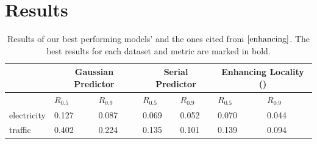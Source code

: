 \documentclass[en]{pracamgr}
\begin{document}


\section{Results}



\begin{table}[h]

\begin{center}
\begin{tabular}
	{ |p{2cm}|p{1.5cm}|p{1.5cm}||p{1.5cm}|p{1.5cm}||p{1.5cm}|p{1.5cm}|  }
	\hline
	& \multicolumn{2}{c||}{Gaussian Predictor} & \multicolumn{2}{|c||}{Serial Predictor} & \multicolumn{2}{|c|}{Enhancing Locality (\cite{enhancing})} \\
	\hline
	& \hfil $R_{0.5}$ & \hfil $R_{0.9}$ & \hfil $R_{0.5}$ & \hfil $R_{0.9}$
	& \hfil $R_{0.5}$ & \hfil $R_{0.9}$
	 \\
	 
	 
	\hline
	electricity & \hfil 0.127   & \hfil 0.087    & \hfil 0.069 &   \hfil 0.052 & \hfil 0.070 & \hfil 0.044 \\
	traffic &  \hfil 0.402   & \hfil 0.224   & \hfil 0.135 &   \hfil 0.101 & \hfil 0.139 & \hfil 0.094\\
	\hline
\end{tabular}
\caption{\label{tab:results}Results of our best performing models' and the ones cited from $\cite{enhancing}$. The best results for each dataset and metric are marked in bold.}
\end{center}
\end{table}


% 



%	
%
%	
\end{document}
